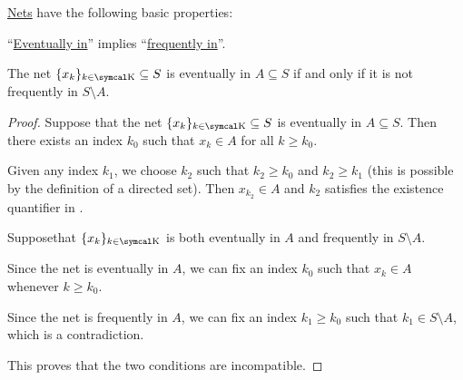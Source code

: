 \begin{proposition}\label{thm:topological_net_properties}
  \hyperref[def:topological_net]{Nets} have the following basic properties:

  \begin{PropEnum}
     \enquote{\hyperref[def:topological_net/eventually_in]{Eventually in}} implies \enquote{\hyperref[def:topological_net/frequently_in]{frequently in}}.

     The net \( \{ x_k \}_{k \in \CK} \subseteq S \) is eventually in \( A \subseteq S \) if and only if it is not frequently in \( S \setminus A \).
  \end{PropEnum}
\end{proposition}
\begin{proof}
   Suppose that the net \( \{ x_k \}_{k \in \CK} \subseteq S \) is eventually in \( A \subseteq S \). Then there exists an index \( k_0 \) such that \( x_k \in A \) for all \( k \geq k_0 \).

  Given any index \( k_1 \), we choose \( k_2 \) such that \( k_2 \geq k_0 \) and \( k_2 \geq k_1 \) (this is possible by the definition of a directed set). Then \( x_{k_2} \in A \) and \( k_2 \) satisfies the existence quantifier in .

   Suppose\LEM that \( \{ x_k \}_{k \in \CK} \) is both eventually in \( A \) and frequently in \( S \setminus A \).

  Since the net is eventually in \( A \), we can fix an index \( k_0 \) such that \( x_k \in A \) whenever \( k \geq k_0 \).

  Since the net is frequently in \( A \), we can fix an index \( k_1 \geq k_0 \) such that \( k_1 \in S \setminus A \), which is a contradiction.

  This proves that the two conditions are incompatible.
\end{proof}

